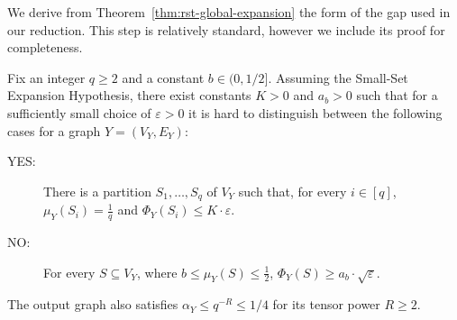We derive from Theorem~\ref{thm:rst-global-expansion} the form of the gap used in our reduction. This step is relatively standard, however we include its proof for completeness.

\begin{lemma}\label{lem:globalized-long-code-gap}
    Fix an integer $q\geq2$ and a constant $b\in(0,1/2]$. Assuming the Small-Set Expansion Hypothesis, there exist constants $K>0$ and $a_b>0$ such that for a sufficiently small choice of $\varepsilon>0$ it is hard to distinguish between the following cases for a graph $Y=(V_Y,E_Y)$:
    \begin{description}
        \item[YES:] There is a partition $S_1,\ldots,S_q$ of $V_Y$
        such that, for every $i\in[q]$, $
            \mu_Y(S_i)=\frac{1}{q}$ and $
            \Phi_Y(S_i)\leq K\cdot\varepsilon$.
        \item[NO:] For every $S\subseteq V_Y$, where $b\leq\mu_Y(S)\leq\frac{1}{2}$, $\Phi_Y(S)\geq a_b\cdot \sqrt{\varepsilon}$.
    \end{description}
    The output graph also satisfies $\alpha_Y\leq q^{-R}\leq1/4$ for its tensor power $R\geq2$.
\end{lemma}
